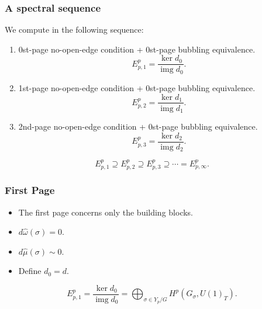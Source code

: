 \documentclass[xcolor=table, 10pt, aspectratio=43]{beamer}
\DeclareMathOperator{\img}{img}
\begin{document}
\begin{frame}
\frametitle{A spectral sequence}
We compute in the following sequence:
\begin{enumerate}
\item 0st-page no-open-edge condition + 0st-page bubbling equivalence.
\[E^p_{p,1}=\frac{\ker d_0}{\img d_0}.\]
\item 1st-page no-open-edge condition + 0st-page bubbling equivalence.
\[E^p_{p,2}=\frac{\ker d_1}{\img d_1}.\]
\item 2nd-page no-open-edge condition + 0st-page bubbling equivalence.
\[E^p_{p,3}=\frac{\ker d_2}{\img d_2}.\]
\end{enumerate}

\[E^p_{p,1}\supseteq E^p_{p,2}\supseteq E^p_{p,3}\supseteq\cdots=E^p_{p,\infty}.\]
\end{frame}

\begin{frame}
\frametitle{First Page}
\begin{center}
\end{center}
\begin{itemize}
\item The first page concerns only the building blocks.
\item $d\hat\omega(\sigma)=0$.
\item $d\hat\mu(\sigma)\sim0$.
\item Define $d_0=d$.
\end{itemize}
\[E^p_{p,1}=\frac{\ker d_0}{\img d_0}
=\bigoplus_{\sigma\in Y_p/G}H^p(G_\sigma, U(1)_T).\]
\end{frame}
\end{document}
